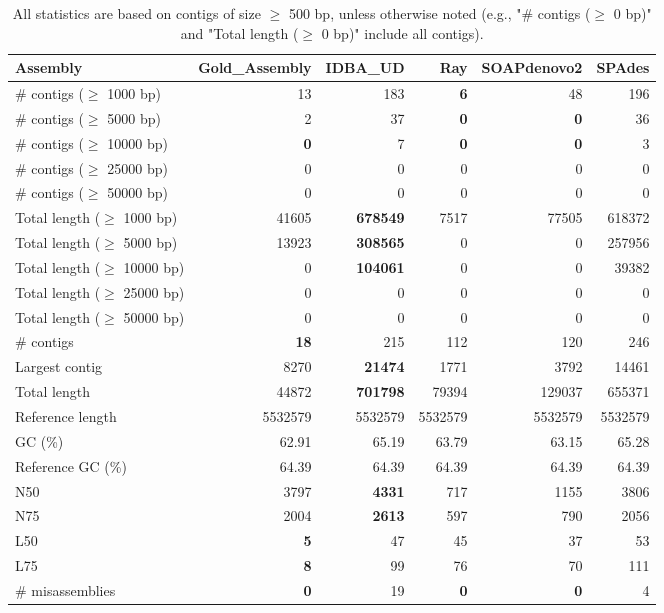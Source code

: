 \documentclass[12pt,a4paper]{article}
\begin{document}
\begin{table}[ht]
\begin{center}
\caption{All statistics are based on contigs of size $\geq$ 500 bp, unless otherwise noted (e.g., "\# contigs ($\geq$ 0 bp)" and "Total length ($\geq$ 0 bp)" include all contigs).}
\begin{tabular}{|l*{5}{|r}|}
\hline
Assembly & Gold\_Assembly & IDBA\_UD & Ray & SOAPdenovo2 & SPAdes \\ \hline
\# contigs ($\geq$ 1000 bp) & 13 & 183 & {\bf 6} & 48 & 196 \\ \hline
\# contigs ($\geq$ 5000 bp) & 2 & 37 & {\bf 0} & {\bf 0} & 36 \\ \hline
\# contigs ($\geq$ 10000 bp) & {\bf 0} & 7 & {\bf 0} & {\bf 0} & 3 \\ \hline
\# contigs ($\geq$ 25000 bp) & 0 & 0 & 0 & 0 & 0 \\ \hline
\# contigs ($\geq$ 50000 bp) & 0 & 0 & 0 & 0 & 0 \\ \hline
Total length ($\geq$ 1000 bp) & 41605 & {\bf 678549} & 7517 & 77505 & 618372 \\ \hline
Total length ($\geq$ 5000 bp) & 13923 & {\bf 308565} & 0 & 0 & 257956 \\ \hline
Total length ($\geq$ 10000 bp) & 0 & {\bf 104061} & 0 & 0 & 39382 \\ \hline
Total length ($\geq$ 25000 bp) & 0 & 0 & 0 & 0 & 0 \\ \hline
Total length ($\geq$ 50000 bp) & 0 & 0 & 0 & 0 & 0 \\ \hline
\# contigs & {\bf 18} & 215 & 112 & 120 & 246 \\ \hline
Largest contig & 8270 & {\bf 21474} & 1771 & 3792 & 14461 \\ \hline
Total length & 44872 & {\bf 701798} & 79394 & 129037 & 655371 \\ \hline
Reference length & 5532579 & 5532579 & 5532579 & 5532579 & 5532579 \\ \hline
GC (\%) & 62.91 & 65.19 & 63.79 & 63.15 & 65.28 \\ \hline
Reference GC (\%) & 64.39 & 64.39 & 64.39 & 64.39 & 64.39 \\ \hline
N50 & 3797 & {\bf 4331} & 717 & 1155 & 3806 \\ \hline
N75 & 2004 & {\bf 2613} & 597 & 790 & 2056 \\ \hline
L50 & {\bf 5} & 47 & 45 & 37 & 53 \\ \hline
L75 & {\bf 8} & 99 & 76 & 70 & 111 \\ \hline
\# misassemblies & {\bf 0} & 19 & {\bf 0} & {\bf 0} & 4 \\ \hline

\end{tabular}
\end{center}
\end{table}
\end{document}
